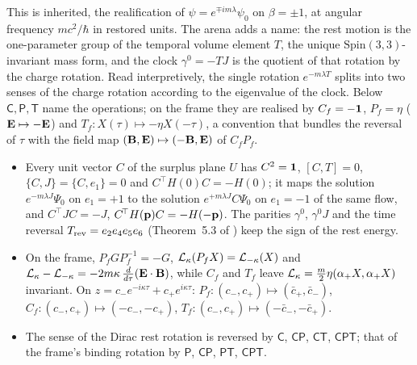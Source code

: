 This is inherited, the realification of $\psi=e^{\mp im\lambda}\psi_0$ on $\beta=\pm1$, at angular frequency $mc^2/\hbar$ in restored units. The arena adds a
name: the rest motion is the one-parameter group of the temporal volume element $T$, the unique $\mathrm{Spin}(3,3)$-invariant mass form, and the
clock $\gamma^0=-TJ$ is the quotient of that rotation by the charge rotation. Read interpretively, the single rotation $e^{-m\lambda T}$ splits into
two senses of the charge rotation according to the eigenvalue of the clock. Below $\mathsf C,\mathsf P,\mathsf T$ name the operations; on the frame
they are realised by $C_f=-\mathbf 1$, $P_f=\eta$ ($\mathbf E\mapsto-\mathbf E$) and $T_f\colon X(\tau)\mapsto-\eta X(-\tau)$, a convention that bundles the reversal of
$\tau$ with the field map $(\mathbf B,\mathbf E)\mapsto(-\mathbf B,\mathbf E)$ of $C_fP_f$.

\begin{proposition}
\label{d2:prop:senses}
\begin{itemize}
\item[(i)] Every unit vector $C$ of the surplus plane $U$ has $C^2=\mathbf 1$, $[C,T]=0$, $\{C,J\}=\{C,e_1\}=0$ and $C^{\!\top}H(0)C=-H(0)$; it maps the solution
$e^{-m\lambda J}\Psi_0$ on $e_1=+1$ to the solution $e^{+m\lambda J}C\Psi_0$ on $e_1=-1$ of the same flow, and $C^{\!\top}JC=-J$,
$C^{\!\top}H(\mathbf p)C=-H(-\mathbf p)$. The parities $\gamma^0$, $\gamma^0J$ and the time reversal $T_{\rm rev}=e_2e_4e_5e_6$ (Theorem~5.3 of \cite{ES17}) keep the sign
of the rest energy.
\item[(ii)] On the frame, $P_fGP_f^{-1}=-G$, $\mathcal L_\kappa(P_fX)=\mathcal L_{-\kappa}(X)$ and $\mathcal L_\kappa-\mathcal L_{-\kappa}=-2m\kappa\,\tfrac{d}{d\tau}(\mathbf E\cdot\mathbf B)$, while
$C_f$ and $T_f$ leave $\mathcal L_\kappa=\tfrac m2\eta(\alpha_+X,\alpha_+X)$ invariant. On $z=c_-e^{-i\kappa\tau}+c_+e^{i\kappa\tau}$:
$P_f\colon(c_-,c_+)\mapsto(\bar c_+,\bar c_-)$, $C_f\colon(c_-,c_+)\mapsto(-c_-,-c_+)$, $T_f\colon(c_-,c_+)\mapsto(-\bar c_-,-\bar c_+)$.
\item[(iii)] The sense of the Dirac rest rotation is reversed by $\mathsf C$, $\mathsf{CP}$, $\mathsf{CT}$, $\mathsf{CPT}$; that of the frame's binding
rotation by $\mathsf P$, $\mathsf{CP}$, $\mathsf{PT}$, $\mathsf{CPT}$.
\end{itemize}
\end{proposition}

